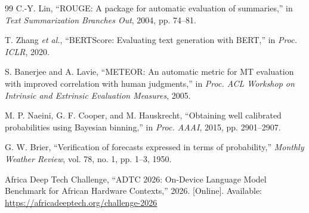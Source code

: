 \documentclass[journal]{IEEEtran}
\begin{document}
\begin{thebibliography}{99}
C.-Y. Lin,
``ROUGE: A package for automatic evaluation of summaries,''
in \textit{Text Summarization Branches Out}, 2004, pp. 74--81.

T. Zhang \textit{et al.},
``BERTScore: Evaluating text generation with BERT,''
in \textit{Proc. ICLR}, 2020.

S. Banerjee and A. Lavie,
``METEOR: An automatic metric for MT evaluation with improved correlation with human judgments,''
in \textit{Proc. ACL Workshop on Intrinsic and Extrinsic Evaluation Measures}, 2005.

M. P. Naeini, G. F. Cooper, and M. Hauskrecht,
``Obtaining well calibrated probabilities using Bayesian binning,''
in \textit{Proc. AAAI}, 2015, pp. 2901--2907.

G. W. Brier,
``Verification of forecasts expressed in terms of probability,''
\textit{Monthly Weather Review}, vol. 78, no. 1, pp. 1--3, 1950.

Africa Deep Tech Challenge, ``ADTC 2026: On-Device Language Model
Benchmark for African Hardware Contexts,'' 2026.
[Online]. Available: \url{https://africadeeptech.org/challenge-2026}

\end{thebibliography}
\end{document}
